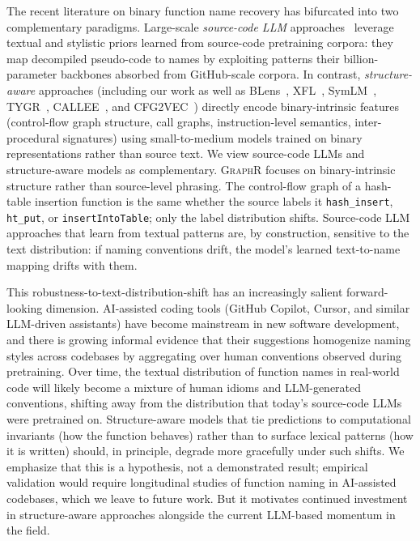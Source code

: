 \documentclass[sigconf,nonacm]{acmart}
\newcommand{\sysname}{\textsc{GraphR}}
\begin{document}
The recent literature on binary function name recovery has bifurcated into two complementary paradigms. Large-scale \emph{source-code LLM} approaches~\cite{symgen,prorec,beyondclass} leverage textual and stylistic priors learned from source-code pretraining corpora: they map decompiled pseudo-code to names by exploiting patterns their billion-parameter backbones absorbed from GitHub-scale corpora. In contrast, \emph{structure-aware} approaches (including our work as well as BLens~\cite{blens}, XFL~\cite{xfl}, SymLM~\cite{symlm}, TYGR~\cite{tygr}, CALLEE~\cite{callee}, and CFG2VEC~\cite{cfg2vec}) directly encode binary-intrinsic features (control-flow graph structure, call graphs, instruction-level semantics, inter-procedural signatures) using small-to-medium models trained on binary representations rather than source text. We view source-code LLMs and structure-aware models as complementary. \sysname{} focuses on binary-intrinsic structure rather than source-level phrasing. The control-flow graph of a hash-table insertion function is the same whether the source labels it \texttt{hash\_insert}, \texttt{ht\_put}, or \texttt{insertIntoTable}; only the label distribution shifts. Source-code LLM approaches that learn from textual patterns are, by construction, sensitive to the text distribution: if naming conventions drift, the model's learned text-to-name mapping drifts with them.

This robustness-to-text-distribution-shift has an increasingly salient forward-looking dimension. AI-assisted coding tools (GitHub Copilot, Cursor, and similar LLM-driven assistants) have become mainstream in new software development, and there is growing informal evidence that their suggestions homogenize naming styles across codebases by aggregating over human conventions observed during pretraining. Over time, the textual distribution of function names in real-world code will likely become a mixture of human idioms and LLM-generated conventions, shifting away from the distribution that today's source-code LLMs were pretrained on. Structure-aware models that tie predictions to computational invariants (how the function behaves) rather than to surface lexical patterns (how it is written) should, in principle, degrade more gracefully under such shifts. We emphasize that this is a hypothesis, not a demonstrated result; empirical validation would require longitudinal studies of function naming in AI-assisted codebases, which we leave to future work. But it motivates continued investment in structure-aware approaches alongside the current LLM-based momentum in the field.
\end{document}

